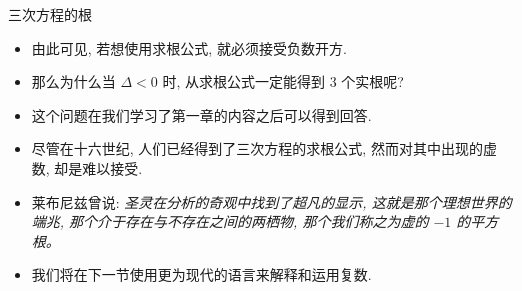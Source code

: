 \begin{frame}{三次方程的根\noexer}
	\onslide<+->
	\begin{itemize}
		\item 由此可见, 若想使用求根公式, 就\alert{必须接受负数开方}.
		\item 那么为什么当 $\Delta<0$ 时, 从求根公式一定能得到 $3$ 个实根呢?
		\item 这个问题在我们学习了第一章的内容之后可以得到回答.
		\item 尽管在十六世纪, 人们已经得到了三次方程的求根公式, 然而对其中出现的虚数, 却是难以接受.
		\item 莱布尼兹曾说: {\color{third}\itshape 圣灵在分析的奇观中找到了超凡的显示, 这就是那个理想世界的端兆, 那个介于存在与不存在之间的两栖物, 那个我们称之为虚的 $-1$ 的平方根。}
		\item 我们将在下一节使用更为现代的语言来解释和运用复数.
	\end{itemize}
\end{frame}

